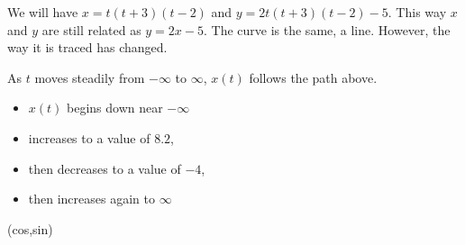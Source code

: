 \documentclass{ximera}
\begin{document}
\begin{image}
\end{image}


We will have $x = t(t+3)(t-2)$ and $y = 2t(t+3)(t-2) - 5$.   This way $x$ and $y$ are still related as $y = 2x - 5$. The curve is the same, a line.  However, the way it is traced has changed.

As $t$ moves steadily from $-\infty$ to $\infty$,  $x(t)$ follows the path above.

\begin{itemize}
\item $x(t)$ begins down near $-\infty$
\item increases to a value of $8.2$, 
\item then decreases to a value of $-4$, 
\item then increases again to $\infty$

\end{itemize}




\begin{center}
\end{center}










(cos,sin)
\end{document}
